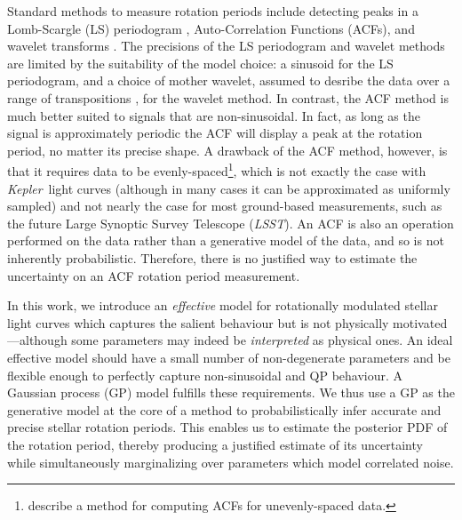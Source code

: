 \documentclass[useAMS, usenatbib, preprint, 12pt]{aastex}
\newcommand{\Kepler}{{\it Kepler}}
\newcommand{\LSST}{{\it LSST}}
\newcommand{\eg}{{\it e.g.}}
\begin{document}
Standard methods to measure rotation periods include detecting
peaks in a Lomb-Scargle \citep{Lomb1976, Scargle1982} (LS) periodogram
\citep[e.g.][]{Reinhold2013}, Auto-Correlation Functions (ACFs),
\citep{Mcquillan2013} and wavelet transforms \citep{Garcia2014}.
The precisions of the LS periodogram and wavelet methods are limited by the
suitability of the model choice: a sinusoid for the LS periodogram, 
and a choice of mother wavelet, assumed to desribe the data
over a range of transpositions \citep[see, \eg][]{Carter2010}, 
for the wavelet method.
In contrast, the ACF method is much better suited to signals that are
non-sinusoidal.
In fact, as long as the signal is approximately periodic the ACF will 
display a peak at the rotation period, no matter its precise shape.
A drawback of the ACF method, however, is that it requires data to be
evenly-spaced\footnote{\citet{Edelson1988} describe a method for computing
ACFs for unevenly-spaced data.}, which is not exactly the case with \Kepler\
light curves (although in many cases it can be approximated as uniformly
sampled) and not nearly the case for most ground-based measurements, such 
as the future Large Synoptic Survey Telescope (\LSST).
An ACF is also an operation performed on the data rather than a generative 
model of the data, and so is not inherently probabilistic.
Therefore, there is no justified way to estimate the uncertainty on an ACF
rotation period measurement.

In this work, we introduce an {\it effective} model for rotationally
modulated stellar light curves
which captures the salient behaviour but is not
physically motivated---although some parameters may indeed be 
{\it interpreted} as physical ones.
An ideal effective model should have a small number of non-degenerate parameters 
and be flexible enough to perfectly capture non-sinusoidal and QP behaviour.
A Gaussian process (GP) model fulfills these requirements. We thus use a GP 
as the generative model at the core of a method to probabilistically 
infer accurate and precise stellar rotation periods.  This enables us to 
estimate the posterior PDF of the rotation period, thereby producing a 
justified estimate of its uncertainty while simultaneously marginalizing over
parameters which model correlated noise.
\end{document}
